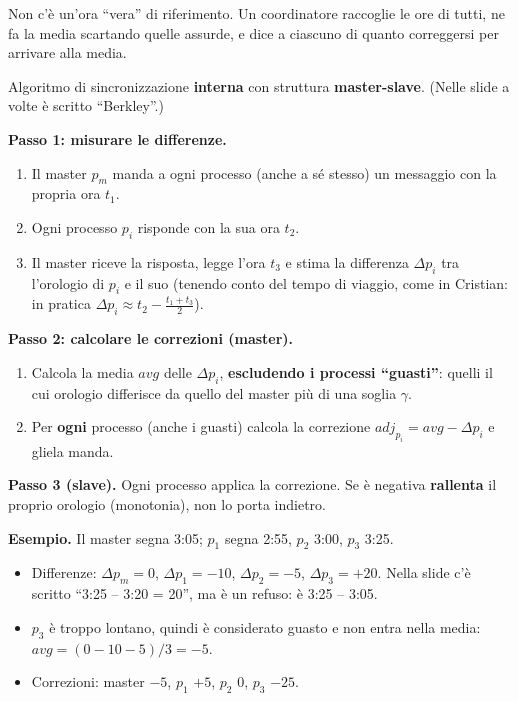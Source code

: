 \begin{inbreve}

Non c'è un'ora ``vera'' di riferimento. Un coordinatore raccoglie le ore di tutti, ne fa la media scartando quelle assurde, e dice a ciascuno di quanto correggersi per arrivare alla media.

\end{inbreve}

Algoritmo di sincronizzazione \textbf{interna} con struttura \textbf{master-slave}. (Nelle slide a volte è scritto ``Berkley''.)

\textbf{Passo 1: misurare le differenze.}

\begin{enumerate}
\def\labelenumi{\arabic{enumi}.}
\tightlist
\item
  Il master \(p_m\) manda a ogni processo (anche a sé stesso) un messaggio con la propria ora \(t_1\).
\item
  Ogni processo \(p_i\) risponde con la sua ora \(t_2\).
\item
  Il master riceve la risposta, legge l'ora \(t_3\) e stima la differenza \(\Delta p_i\) tra l'orologio di \(p_i\) e il suo (tenendo conto del tempo di viaggio, come in Cristian: in pratica \(\Delta p_i \approx t_2 - \frac{t_1 + t_3}{2}\)).
\end{enumerate}

\textbf{Passo 2: calcolare le correzioni (master).}

\begin{enumerate}
\def\labelenumi{\arabic{enumi}.}
\tightlist
\item
  Calcola la media \(avg\) delle \(\Delta p_i\), \textbf{escludendo i processi ``guasti''}: quelli il cui orologio differisce da quello del master più di una soglia \(\gamma\).
\item
  Per \textbf{ogni} processo (anche i guasti) calcola la correzione \(adj_{p_i} = avg - \Delta p_i\) e gliela manda.
\end{enumerate}

\textbf{Passo 3 (slave).} Ogni processo applica la correzione. Se è negativa \textbf{rallenta} il proprio orologio (monotonia), non lo porta indietro.

\textbf{Esempio.} Il master segna 3:05; \(p_1\) segna 2:55, \(p_2\) 3:00, \(p_3\) 3:25.

\begin{itemize}
\tightlist
\item
  Differenze: \(\Delta p_m = 0\), \(\Delta p_1 = -10\), \(\Delta p_2 = -5\), \(\Delta p_3 = +20\). Nella slide c'è scritto ``3:25 -- 3:20 = 20'', ma è un refuso: è 3:25 -- 3:05.
\item
  \(p_3\) è troppo lontano, quindi è considerato guasto e non entra nella media: \(avg = (0 - 10 - 5)/3 = -5\).
\item
  Correzioni: master \(-5\), \(p_1\) \(+5\), \(p_2\) \(0\), \(p_3\) \(-25\).
\end{itemize}


